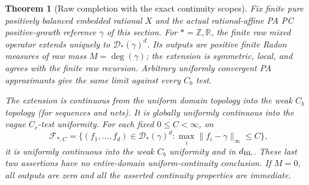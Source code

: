 \documentclass[11pt]{article}
\newtheorem{theorem}{Theorem}
\newcommand{\R}{\mathbb R}
\newcommand{\Z}{\mathbb Z}
\begin{document}
\begin{theorem}[Raw completion with the exact continuity scopes]\label{raw-extension}
Fix finite pure positively balanced embedded rational $X$ and the actual
rational-affine PA PC positive-growth reference $\gamma$ of this section.
For $*=\Z,\R$, the finite raw mixed operator extends uniquely to
$\mathcal D_*(\gamma)^d$. Its outputs are positive finite Radon measures
of raw mass $M=\deg(\gamma)$; the extension is symmetric, local, and
agrees with the finite raw recursion. Arbitrary uniformly convergent PA
approximants give the same limit against every $C_b$ test.

The extension is continuous from the uniform domain topology into the
weak $C_b$ topology (for sequences and nets). It is globally uniformly
continuous into the vague $C_c$-test uniformity. For \emph{each fixed}
$0\leq C<\infty$, on
\[
 \mathcal F_{*,C}=\{(f_1,\ldots,f_d)\in\mathcal D_*(\gamma)^d:
                   \max_i\|f_i-\gamma\|_\infty\leq C\},
\]
it is uniformly continuous into the weak $C_b$ uniformity and in
$d_{\rm BL}$. These last two assertions have no entire-domain
uniform-continuity conclusion. If $M=0$, all outputs are zero and
all the asserted continuity properties are immediate.
\end{theorem}
\end{document}

